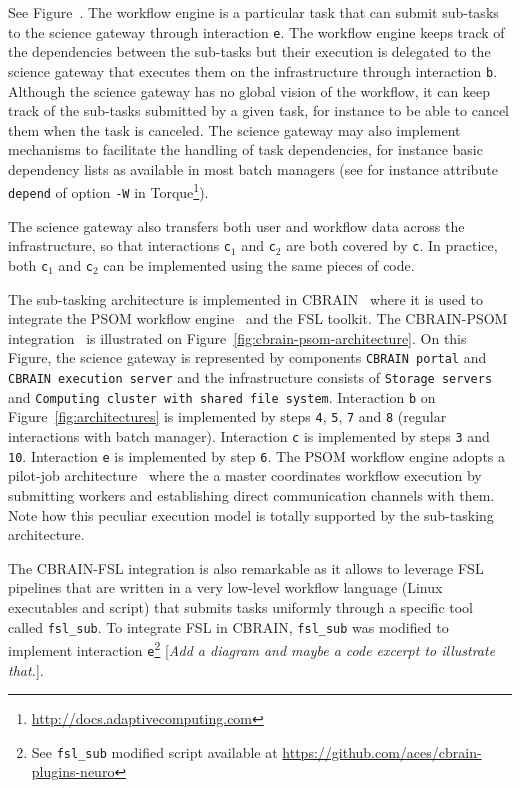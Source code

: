 \documentclass[preprint,3p,twocolumn]{elsarticle}
\newcommand{\todo}[1]{\color{blue}\xspace[\emph{#1}]\xspace\color{black}}
\begin{document}
See Figure~. The workflow engine is a particular
task that can submit sub-tasks to the science gateway through
interaction \texttt{e}. The workflow engine keeps track of the
dependencies between the sub-tasks but their execution is delegated to
the science gateway that executes them on the infrastructure through
interaction \texttt{b}. Although the science gateway has no global
vision of the workflow, it can keep track of the sub-tasks submitted
by a given task, for instance to be able to cancel them when the task
is canceled. The science gateway may also implement mechanisms to
facilitate the handling of task dependencies, for instance basic
dependency lists as available in most batch managers (see for instance
attribute \texttt{depend} of option \texttt{-W} in
Torque\footnote{\url{http://docs.adaptivecomputing.com}}).

The science gateway also transfers both user and workflow data across
the infrastructure, so that interactions \texttt{c$_1$} and
\texttt{c$_2$} are both covered by \texttt{c}. In practice, both
\texttt{c$_1$} and \texttt{c$_2$} can be implemented using the same
pieces of code.

The sub-tasking architecture is implemented in CBRAIN~\cite{SHER-14}
where it is used to integrate the PSOM workflow
engine~\cite{bellec2012pipeline} and the FSL toolkit. The CBRAIN-PSOM
integration~\cite{GLAT-16} is illustrated on
Figure~\ref{fig:cbrain-psom-architecture}. On this Figure, the science
gateway is represented by components \texttt{CBRAIN portal} and
\texttt{CBRAIN execution server} and the infrastructure consists of
\texttt{Storage servers} and \texttt{Computing cluster with shared
  file system}. Interaction \texttt{b} on
Figure~\ref{fig:architectures} is implemented by steps \texttt{4},
\texttt{5}, \texttt{7} and \texttt{8} (regular interactions with batch
manager). Interaction \texttt{c} is implemented by steps \texttt{3}
and \texttt{10}. Interaction \texttt{e} is implemented by step
\texttt{6}. The PSOM workflow engine adopts a pilot-job
architecture~\cite{turilli2015comprehensive} where the a master
coordinates workflow execution by submitting workers and establishing
direct communication channels with them. Note how this peculiar
execution model is totally supported by the sub-tasking architecture.

The CBRAIN-FSL integration is also remarkable as it allows to leverage
FSL pipelines that are written in a very low-level workflow language
(Linux executables and script) that submits tasks uniformly through a
specific tool called \texttt{fsl\_sub}. To integrate FSL in CBRAIN,
\texttt{fsl\_sub} was modified to implement interaction
\texttt{e}\footnote{See \texttt{fsl\_sub} modified script available at
  \url{https://github.com/aces/cbrain-plugins-neuro}} \todo{Add a
  diagram and maybe a code excerpt to illustrate that.}.
\end{document}
